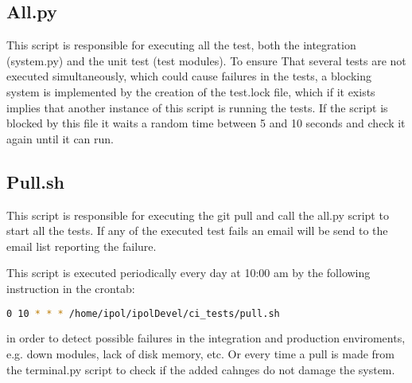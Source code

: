 \subsection{All.py}

This script is responsible for executing all the test, both the integration (system.py) and the unit test (test modules). To ensure
That several tests are not executed simultaneously, which could cause failures in the tests, a blocking system is implemented by the creation 
of the test.lock file, which if it exists implies that another instance of this script is running the tests.
If the script is blocked by this file it waits a random time between 5 and 10 seconds and check it again until it can run.


\subsection{Pull.sh}

This script is responsible for executing the git pull and call the all.py script to start all the tests. If any of the executed test fails an email
will be send to the email list reporting the failure.

This script is executed periodically every day at 10:00 am by the following instruction in the crontab: \begin{lstlisting}[language=Bash]
 0 10 * * * /home/ipol/ipolDevel/ci_tests/pull.sh
\end{lstlisting} in order to detect possible failures in the integration and production
enviroments, e.g. down modules, lack of disk memory, etc. Or every time a pull is made from the terminal.py script to check if the added cahnges do not
damage the system.
